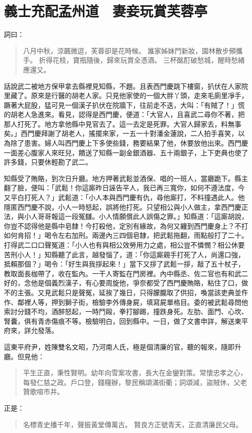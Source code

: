 
\chapter{義士充配孟州道　妻妾玩賞芙蓉亭}

詞曰：
\begin{quote}
八月中秋，涼飆微逗，芙蓉卻是花時候。
誰家姊妹鬥新妝，園林散步頻攜手。
折得花枝，寶瓶隨後，歸來玩賞全憑酒。
三杯酩酊破愁城，醒時愁緒應還又。
\end{quote}

話說武二被地方保甲拿去縣裡見知縣，不題。且表西門慶跳下樓窗，扒伏在人家院里藏了。原來是行醫的胡老人家。只見他家使的一個大胖丫頭，走來毛廁里凈手，蹶著大屁股，猛可見一個漢子扒伏在院牆下，往前走不迭，大叫：「有賊了！」慌的胡老人急進來。看見，認得是西門慶，便道：「大官人，且喜武二尋你不著，把那人打死了。地方拿他縣中見官去了。這一去定是死罪。大官人歸家去，料無事矣。」西門慶拜謝了胡老人，搖擺來家，一五一十對潘金蓮說，二人拍手喜笑，以為除了患害。婦人叫西門慶上下多使些錢，務要結果了他，休要放他出來。西門慶一面差心腹家人來旺兒，饋送了知縣一副金銀酒器、五十兩銀子，上下吏典也使了許多錢，只要休輕勘了武二。

知縣受了賄賂，到次日升廳。地方押著武鬆並酒保、唱的一班人，當廳跪下。縣主翻了臉，便叫：「武鬆！你這廝昨日誣告平人，我已再三寬你，如何不遵法度，今又平白打死人？」武鬆道：「小人本與西門慶有仇，尋他廝打，不料撞遇此人。他隱匿西門慶不說，小人一時怒起，誤將他打死。只望相公與小人做主，拿西門慶正法，與小人哥哥報這一段冤讎。小人情願償此人誤傷之罪。」知縣道：「這廝胡說，你豈不認得他是縣中皂隸！今打殺他，定別有緣故，為何又纏到西門慶身上？不打如何肯招！」喝令左右加刑。兩邊內三四個皂隸，把武鬆拖翻，雨點般打了二十。打得武二口口聲冤道：「小人也有與相公效勞用力之處，相公豈不憐憫？相公休要苦刑小人！」知縣聽了此言，越發惱了，道：「你這廝親手打死了人，尚還口強，抵賴那個？」喝令：「好生與我拶起來！」當下又拶了武鬆一拶，敲了五十杖子，教取面長枷帶了，收在監內。一干人寄監在門房裡。內中縣丞、佐二官也有和武二好的，念他是個義烈漢子，有心要周旋他，爭奈都受了西門慶賄賂，粘住了口，做不的主張。又見武鬆只是聲冤，延挨了幾日，只得朦朧取了供招，喚當該吏典並仵作、鄰裡人等，押到獅子街，檢驗李外傳身屍，填寫屍單格目。委的被武鬆尋問他索討分錢不均，酒醉怒起，一時鬥毆，拳打腳踢，撞跌身死。左肋、面門、心坎、腎囊，俱有青赤傷痕不等。檢驗明白，回到縣中。一日，做了文書申詳，解送東平府來，詳允發落。

這東平府尹，姓陳雙名文昭，乃河南人氏，極是個清廉的官，聽的報來，隨即升廳。但見他：
\begin{quote}
平生正直，秉性賢明。幼年向雪案攻書，長大在金鑾對策。常懷忠孝之心，每發仁慈之政。戶口登，錢糧辦，黎民稱頌滿街衢；詞頌減，盜賊休，父老贊歌喧市井。
\end{quote}
正是：
\begin{quote}
名標青史播千年，聲振黃堂傳萬古。
賢良方正號青天，正直清廉民父母。
\end{quote}

